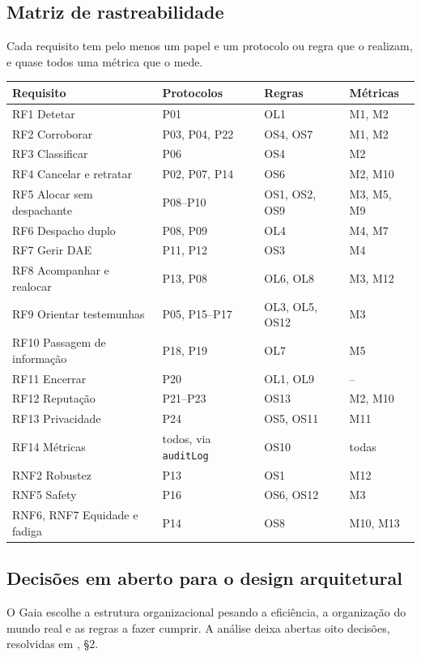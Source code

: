 \documentclass[10pt,a4paper]{article}
\newcommand{\id}[1]{\texttt{#1}}
\begin{document}
\subsection{Matriz de rastreabilidade}\label{sec:rastreabilidade}

Cada requisito tem pelo menos um papel e um protocolo ou regra que o realizam, e quase todos uma métrica que o mede.

{\small
\begin{xltabular}{\linewidth}{@{}P{4.4cm}LLL@{}}
\toprule
Requisito & Protocolos & Regras & Métricas \\
\midrule
\endhead
RF1 Detetar & P01 & OL1 & M1, M2 \\
RF2 Corroborar & P03, P04, P22 & OS4, OS7 & M1, M2 \\
RF3 Classificar & P06 & OS4 & M2 \\
RF4 Cancelar e retratar & P02, P07, P14 & OS6 & M2, M10 \\
RF5 Alocar sem despachante & P08--P10 & OS1, OS2, OS9 & M3, M5, M9 \\
RF6 Despacho duplo & P08, P09 & OL4 & M4, M7 \\
RF7 Gerir DAE & P11, P12 & OS3 & M4 \\
RF8 Acompanhar e realocar & P13, P08 & OL6, OL8 & M3, M12 \\
RF9 Orientar testemunhas & P05, P15--P17 & OL3, OL5, OS12 & M3 \\
RF10 Passagem de informação & P18, P19 & OL7 & M5 \\
RF11 Encerrar & P20 & OL1, OL9 & -- \\
RF12 Reputação & P21--P23 & OS13 & M2, M10 \\
RF13 Privacidade & P24 & OS5, OS11 & M11 \\
RF14 Métricas & todos, via \id{auditLog} & OS10 & todas \\
RNF2 Robustez & P13 & OS1 & M12 \\
RNF5 Safety & P16 & OS6, OS12 & M3 \\
RNF6, RNF7 Equidade e fadiga & P14 & OS8 & M10, M13 \\
\bottomrule
\end{xltabular}
}

\subsection{Decisões em aberto para o design arquitetural}\label{sec:decisoes}

O Gaia escolhe a estrutura organizacional pesando a eficiência, a organização do mundo real e as regras a fazer cumprir. A análise deixa abertas oito decisões, resolvidas em , §2.
\end{document}
